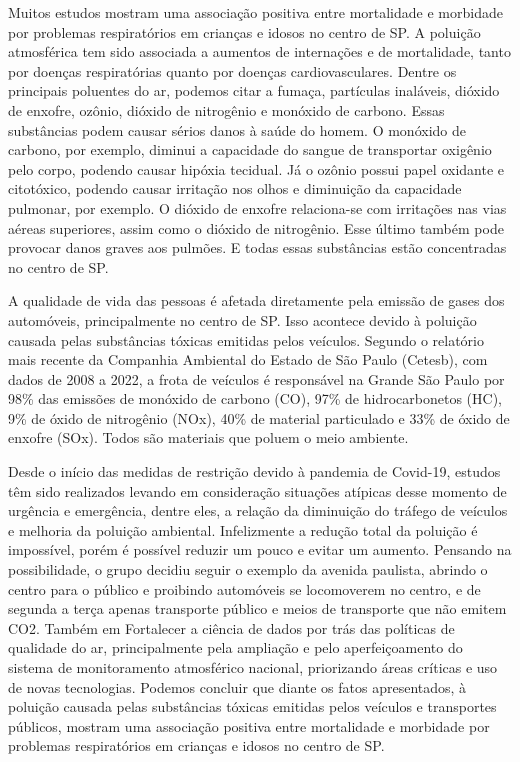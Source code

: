 \documentclass[
	article,			%
	11pt,				%
	oneside,			%
	a4paper,			%
	english,			%
	brazil,				%
	sumario=tradicional
	]{abntex2}
\begin{document}
Muitos estudos mostram uma associação positiva entre mortalidade e morbidade por problemas respiratórios em crianças e idosos no centro de SP.  A poluição atmosférica tem sido associada a aumentos de internações e de mortalidade, tanto por doenças respiratórias quanto por doenças cardiovasculares. Dentre os principais poluentes do ar, podemos citar a fumaça, partículas inaláveis, dióxido de enxofre, ozônio, dióxido de nitrogênio e monóxido de carbono. Essas substâncias podem causar sérios danos à saúde do homem. O monóxido de carbono, por exemplo, diminui a capacidade do sangue de transportar oxigênio pelo corpo, podendo causar hipóxia tecidual. Já o ozônio possui papel oxidante e citotóxico, podendo causar irritação nos olhos e diminuição da capacidade pulmonar, por exemplo. O dióxido de enxofre relaciona-se com irritações nas vias aéreas superiores, assim como o dióxido de nitrogênio. Esse último também pode provocar danos graves aos pulmões. E todas essas substâncias estão concentradas no centro de SP.

A qualidade de vida das pessoas é afetada diretamente pela emissão de gases dos automóveis, principalmente no centro de SP. Isso acontece devido à poluição causada pelas substâncias tóxicas emitidas pelos veículos. Segundo o relatório mais recente da Companhia Ambiental do Estado de São Paulo (Cetesb), com dados de 2008 a 2022, a frota de veículos é responsável na Grande São Paulo por 98\% das emissões de monóxido de carbono (CO), 97\% de hidrocarbonetos (HC), 9\% de óxido de nitrogênio (NOx), 40\% de material particulado e 33\% de óxido de enxofre (SOx). Todos são materiais que poluem o meio ambiente.

Desde o início das medidas de restrição devido à pandemia de Covid-19, estudos têm sido realizados levando em consideração situações atípicas desse momento de urgência e emergência, dentre eles, a relação da diminuição do tráfego de veículos e melhoria da poluição ambiental.  Infelizmente a redução total da poluição é impossível, porém é possível reduzir um pouco e evitar um aumento. Pensando na possibilidade, o grupo decidiu seguir  o exemplo da avenida paulista, abrindo o centro para o público e proibindo automóveis se locomoverem no centro, e de segunda a terça apenas transporte público e meios de transporte que não emitem CO2.  Também em Fortalecer a ciência de dados por trás das políticas de qualidade do ar, principalmente pela ampliação e pelo aperfeiçoamento do sistema de monitoramento atmosférico nacional, priorizando áreas críticas e uso de novas tecnologias.
Podemos concluir que diante os fatos apresentados, à poluição causada pelas substâncias tóxicas emitidas pelos veículos e transportes públicos, mostram uma associação positiva entre mortalidade e morbidade por problemas respiratórios em crianças e idosos no centro de SP.
\end{document}
